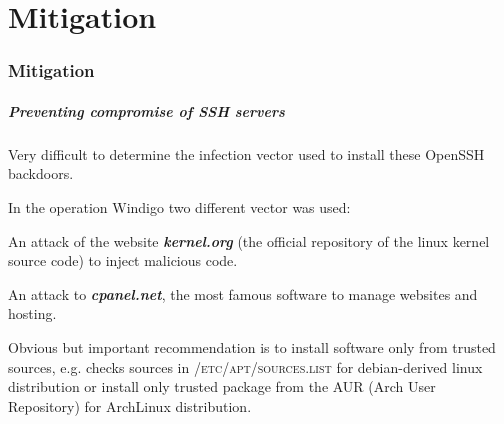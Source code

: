 \part{Mitigation}
\section{Mitigation}

\begin{frame}
	\partpage
\end{frame}

\begin{frame}
	\frametitle{Preventing compromise of SSH servers}
	
	
	Very difficult to determine the infection vector used to install these OpenSSH backdoors.
	
	\medskip
	
	In the operation Windigo two different vector was used: 
	
	\smallskip
	
	An attack of the website \textbf{\textit{kernel.org}} (the official repository of the linux kernel source code) to inject malicious code.
	
	\smallskip
	
	An attack to \textbf{\textit{cpanel.net}}, the most famous software to manage websites and hosting.

  \medskip
  
  Obvious but important recommendation is to install software only from trusted sources, e.g. checks sources in \textsc{/etc/apt/sources.list} for debian-derived linux distribution or install only trusted package from the AUR (Arch User Repository) for ArchLinux distribution. 
  	
\end{frame}


